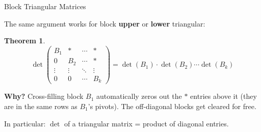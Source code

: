 \documentclass[10pt]{beamer}
\theoremstyle{definition}
\newtheorem{thm}{Theorem}[section]
\newcommand{\x}[1]{\alert{\textbf{#1}}}
\begin{document}
\begin{frame}{Block Triangular Matrices}

The same argument works for block \x{upper} or \x{lower} triangular:

\vfill

\begin{thm}
$$
\det\begin{pmatrix} B_1 & * & \cdots & * \\ 0 & B_2 & \cdots & * \\ \vdots & \vdots & \ddots & \vdots \\ 0 & 0 & \cdots & B_k \end{pmatrix}
= \det(B_1)\cdot\det(B_2)\cdots\det(B_k)
$$
\end{thm}

\vfill

\textbf{Why?} Cross-filling block $B_1$ automatically zeros out the $*$ entries above it (they are in the same rows as $B_1$'s pivots). The off-diagonal blocks get cleared for free.

\vfill

In particular: $\det$ of a triangular matrix = product of diagonal entries.

\end{frame}
\end{document}
